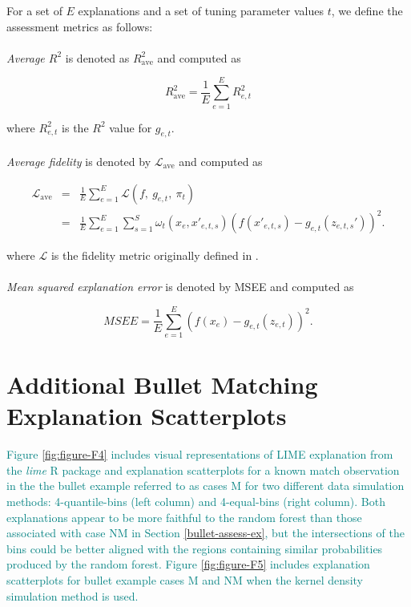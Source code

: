 \documentclass[AMS,STIX2COL]{WileyNJD-v2}\usepackage[]{graphicx}\usepackage[]{color}
\newcommand{\kge}[1]{\textcolor{teal}{#1}}
\begin{document}
For a set of $E$ explanations and a set of tuning parameter values $t$, we define the assessment metrics as follows:\\
\\
\emph{Average $R^2$} is denoted as $R^2_{\mbox{ave}}$ and computed as

  $$R^2_{\mbox{ave}} = \frac{1}{E}\sum_{e=1}^E R_{e,t}^2$$

\noindent where $R_{e,t}^2$ is the $R^2$ value for $g_{e,t}$.\\
\\
\emph{Average fidelity} is denoted by $\mathcal{L}_{\mbox{ave}}$ and computed as

\begin{eqnarray*} \mathcal{L}_{\mbox{ave}} & = & \frac{1}{E}\sum_{e=1}^E\mathcal{L}(f, \ g_{e,t}, \ \pi_{t}) \\ & = & \frac{1}{E}\sum_{e=1}^E\sum_{s=1}^{S}\omega_{t}\left(x_e, x'_{e,t,s}\right)\left(f\left(x'_{e,t,s}\right)-g_{e,t}\left(z_{e,t,s}'\right)\right)^2. \end{eqnarray*}

\noindent where $\mathcal{L}$ is the fidelity metric originally defined in \citet{ribeiro:2016}.\\
\\
\emph{Mean squared explanation error} is denoted by MSEE and computed as

$$MSEE=\frac{1}{E}\sum_{e=1}^E\left(f\left(x_e\right)-g_{e,t}\left(z_{e,t}\right)\right)^2.$$

\section{Additional Bullet Matching Explanation Scatterplots} \label{bullets-plus}

\kge{Figure \ref{fig:figure-F4} includes visual representations of LIME explanation from the \emph{lime} R package and explanation scatterplots for a known match observation in the the bullet example referred to as cases M for two different data simulation methods: 4-quantile-bins (left column) and 4-equal-bins (right column). Both explanations appear to be more faithful to the random forest than those associated with case NM in Section \ref{bullet-assess-ex}, but the intersections of the bins could be better aligned with the regions containing similar probabilities produced by the random forest. Figure \ref{fig:figure-F5} includes explanation scatterplots for bullet example cases M and NM when the kernel density simulation method is used.}
\end{document}
